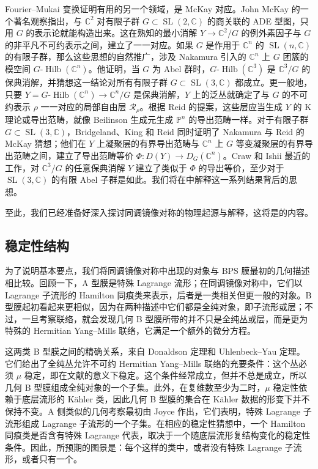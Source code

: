 Fourier--Mukai 变换证明有用的另一个领域，是 McKay 对应。John McKay 的一个著名观察指出，与 $\mathbb{C}^2$ 对有限子群 $G\subset\operatorname{SL}(2,\mathbb{C})$ 的商关联的 ADE 型图，只用 $G$ 的表示论就能构造出来。这在熟知的最小消解 $Y\to\mathbb{C}^2/G$ 的例外素因子与 $G$ 的非平凡不可约表示之间，建立了一一对应。如果 $G$ 是作用于 $\mathbb{C}^n$ 的 $\operatorname{SL}(n,\mathbb{C})$ 的有限子群，那么这些思想的自然推广，涉及 Nakamura 引入的 $\mathbb{C}^n$ 上 $G$ 团簇的模空间 $G\text{-}\operatorname{Hilb}(\mathbb{C}^n)$。他证明，当 $G$ 为 Abel 群时，$G\text{-}\operatorname{Hilb}(\mathbb{C}^3)$ 是 $\mathbb{C}^3/G$ 的保典消解，并猜想这一结论对所有有限子群 $G\subset\operatorname{SL}(3,\mathbb{C})$ 都成立。更一般地，只要 $Y=G\text{-}\operatorname{Hilb}(\mathbb{C}^n)\to\mathbb{C}^n/G$ 是保典消解，$Y$ 上的泛丛就确定了与 $G$ 的不可约表示 $\rho$ 一一对应的局部自由层 $\mathcal{R}_\rho$。根据 Reid 的提案，这些层应当生成 $Y$ 的 K 理论或导出范畴，就像 Beilinson 生成元生成 $\mathbb{P}^n$ 的导出范畴一样。对于有限子群 $G\subset\operatorname{SL}(3,\mathbb{C})$，Bridgeland、King 和 Reid 同时证明了 Nakamura 与 Reid 的 McKay 猜想；他们在 $Y$ 上凝聚层的有界导出范畴与 $\mathbb{C}^n$ 上 $G$ 等变凝聚层的有界导出范畴之间，建立了导出范畴等价 $\Phi\colon D(Y)\to D_G(\mathbb{C}^n)$。Craw 和 Ishii 最近的工作，对 $\mathbb{C}^3/G$ 的任意保典消解 $Y$ 建立了类似于 $\Phi$ 的导出等价，至少对于 $\operatorname{SL}(3,\mathbb{C})$ 的有限 Abel 子群是如此。我们将在中解释这一系列结果背后的思想。

至此，我们已经准备好深入探讨同调镜像对称的物理起源与解释，这将是的内容。

\subsection{稳定性结构}\label{sec:1.2.1}

为了说明基本要点，我们将同调镜像对称中出现的对象与 BPS 膜最初的几何描述相比较。回顾一下，A 型膜是特殊 Lagrange 流形；在同调镜像对称中，它们以 Lagrange 子流形的 Hamilton 同痕类来表示，后者是一类相关但更一般的对象。B 型膜起初看起来更相似，因为在两种描述中它们都是全纯对象，即子流形或层；不过，一旦考察联络，就会发现几何 B 型膜所带的并不只是全纯丛或层，而是更为特殊的 Hermitian Yang--Mills 联络，它满足一个额外的微分方程。

这两类 B 型膜之间的精确关系，来自 Donaldson 定理和 Uhlenbeck--Yau 定理。它们给出了全纯丛允许不可约 Hermitian Yang--Mills 联络的充要条件：这个丛必须 $\mu$ 稳定，即在文献的意义下稳定。这个条件经常成立，但并不总是成立，所以几何 B 型膜组成全纯对象的一个子集。此外，在复维数至少为二时，$\mu$ 稳定性依赖于底层流形的 Kähler 类，因此几何 B 型膜的集合在 Kähler 数据的形变下并不保持不变。A 侧类似的几何考察最初由 Joyce 作出，它们表明，特殊 Lagrange 子流形组成 Lagrange 子流形的一个子集。在相应的稳定性猜想中，一个 Hamilton 同痕类是否含有特殊 Lagrange 代表，取决于一个随底层流形复结构变化的稳定性条件。因此，所预期的图景是：每个这样的类中，或者没有特殊 Lagrange 子流形，或者只有一个。

